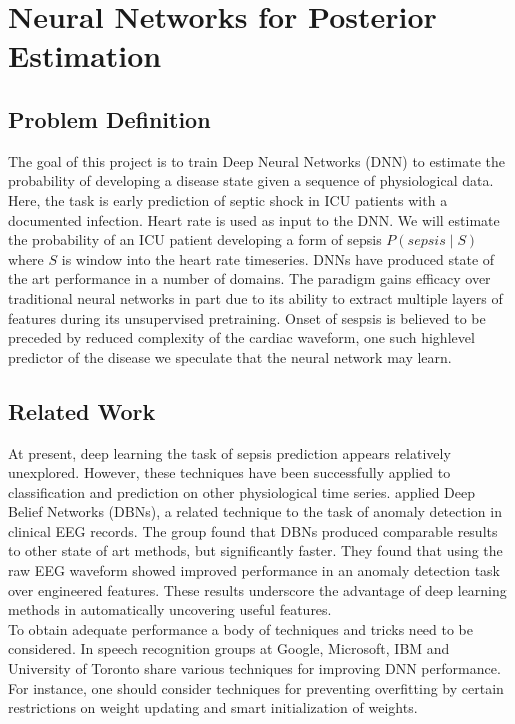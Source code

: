 \documentclass[12pt,solutions]{article}
\begin{document}
\setcounter{section}{3}
\section{Neural Networks for Posterior Estimation}

\subsection{Problem Definition}
The goal of this project is to train Deep Neural Networks (DNN) to estimate the probability of developing a disease state given a sequence of
physiological data. Here, the task is early prediction of septic shock in ICU patients with a documented infection. Heart rate is used as input to
the DNN. We will estimate the probability of an ICU patient developing a form of sepsis $P(sepsis \mid S)$ where $S$ is window into the 
heart rate timeseries. DNNs have produced state of the art performance in a number of domains. The paradigm gains efficacy over traditional neural networks in part due to its ability to extract multiple layers of features during its unsupervised pretraining. Onset of sespsis is believed to be preceded by reduced complexity of the cardiac waveform, one such highlevel predictor of the disease we speculate that the neural network may learn. 

\subsection{Related Work}

At present, deep learning the task of sepsis prediction appears relatively unexplored. However, these techniques have been successfully applied to classification and prediction on other physiological time series. \cite{wulsin2011modeling} applied Deep Belief Networks (DBNs), a related technique to the task of anomaly detection in clinical EEG records. The group found that 
DBNs produced comparable results to other state of art methods, but significantly faster. They found
that using the raw EEG waveform showed improved performance in an
anomaly detection task over engineered features.
These results underscore the advantage of deep learning methods in 
automatically uncovering useful features. \\

To obtain adequate performance a body of techniques and tricks need to be considered. In \cite{hinton2012deep} speech recognition groups at Google, Microsoft, IBM and University of Toronto share various techniques for improving DNN performance. For instance, one should consider techniques for
preventing overfitting by certain restrictions on weight updating and smart initialization of weights.
\end{document}
